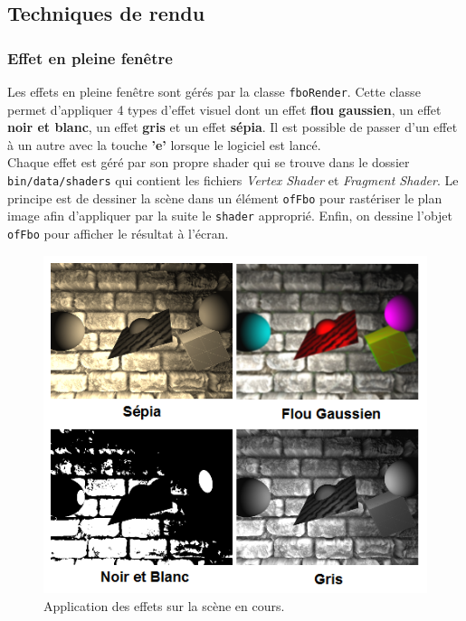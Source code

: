 \subsection{Techniques de rendu}
\subsubsection{Effet en pleine fenêtre}
\label{s:effect}
Les effets en pleine fenêtre sont gérés par la classe \texttt{fboRender}. Cette classe permet d'appliquer 4 types d'effet visuel dont un effet \textbf{flou gaussien}, un effet \textbf{noir et blanc}, un effet \textbf{gris} et un effet \textbf{sépia}. Il est possible de passer d'un effet à un autre avec la touche \textbf{'e'} lorsque le logiciel est lancé. \\

Chaque effet est géré par son propre shader qui se trouve dans le dossier \texttt{bin/data/shaders} qui contient les fichiers \textit{Vertex Shader} et \textit{Fragment Shader}. Le principe est de dessiner la scène dans un élément \texttt{ofFbo} pour rastériser le plan image afin d'appliquer par la suite le \texttt{shader} approprié. Enfin, on dessine l'objet \texttt{ofFbo} pour afficher le résultat à l'écran.

\begin{figure}[H]
    \centering
	\includegraphics[scale=1]{img/infog-image-effet-plein-ecran.png}
	\caption{Application des effets sur la scène en cours.}
	\label{fig:effects}
\end{figure}


